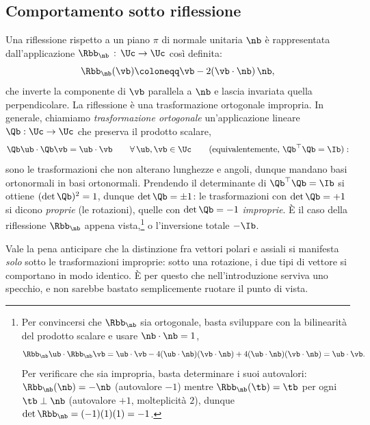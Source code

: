 \subsection{Comportamento sotto riflessione}\label{sez:comportamento_riflessione}
Una riflessione rispetto a un piano $\pi$ di normale unitaria $\nb$ è
rappresentata dall'applicazione $\Rbb_{\nb}\,:\, \Uc\to\Uc$ così definita:
\begin{equation}
	\Rbb_{\nb}(\vb) \coloneqq \vb - 2(\vb \cdot \nb)\,\nb,
\end{equation}
che inverte la componente di $\vb$ parallela a $\nb$ e lascia invariata
quella perpendicolare. La riflessione è una trasformazione ortogonale
impropria.
In generale, chiamiamo \emph{trasformazione ortogonale}
un'applicazione lineare $\Qb:\Uc\to\Uc$ che preserva il prodotto scalare,
\begin{equation}
	\Qb\ub\cdot\Qb\vb=\ub\cdot\vb \qquad \forall\,\ub,\vb\in\Uc
	\qquad\text{(equivalentemente, }\Qb^\top\Qb=\Ib\text{)}:
\end{equation}
sono le trasformazioni che non alterano lunghezze e angoli, dunque mandano
basi ortonormali in basi ortonormali. Prendendo il determinante di
$\Qb^\top\Qb=\Ib$ si ottiene $(\det\Qb)^2=1$, dunque $\det\Qb=\pm1$: le
trasformazioni con $\det\Qb=+1$ si dicono \emph{proprie} (le rotazioni),
quelle con $\det\Qb=-1$ \emph{improprie}. È il caso della riflessione $\Rbb_\nb$
appena vista,\footnote{Per convincersi che $\Rbb_{\nb}$ sia ortogonale, basta 
	sviluppare con la bilinearità del
	prodotto scalare e usare $\nb\cdot\nb=1$,
	\begin{equation}
		\Rbb_{\nb}\ub\cdot\Rbb_{\nb}\vb
		=\ub\cdot\vb-4(\ub\cdot\nb)(\vb\cdot\nb)+4(\ub\cdot\nb)(\vb\cdot\nb)=\ub\cdot\vb.
	\end{equation}
	Per verificare che sia impropria, basta determinare i suoi autovalori: $\Rbb_\nb(\nb)=-\nb$ (autovalore $-1$) mentre
	$\Rbb_\nb(\tb)=\tb$ per ogni $\tb\perp\nb$ (autovalore $+1$, molteplicità
	$2$), dunque $\det\Rbb_\nb=(-1)(1)(1)=-1$.} o l'inversione totale $-\Ib$. 



Vale la
pena anticipare che la distinzione fra vettori polari e assiali si
manifesta \emph{solo} sotto le trasformazioni improprie: sotto una
rotazione, i due tipi di vettore si
comportano in modo identico. È per questo che nell'introduzione serviva
uno specchio, e non sarebbe bastato semplicemente ruotare il punto di
vista.



